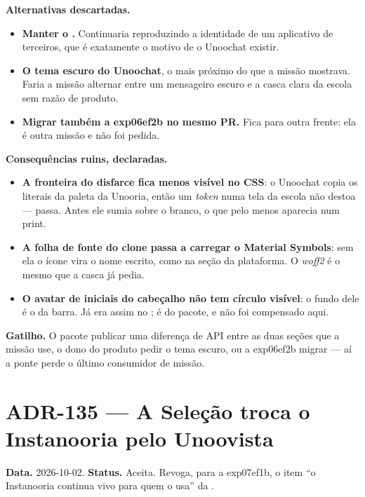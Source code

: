 \textbf{Alternativas descartadas.}

\begin{itemize}
  \item \textbf{Manter o .} Continuaria reproduzindo a
    identidade de um aplicativo de terceiros, que é exatamente o motivo de o
    Unoochat existir.
  \item \textbf{O tema escuro do Unoochat}, o mais próximo do que a missão
    mostrava. Faria a missão alternar entre um mensageiro escuro e a casca
    clara da escola sem razão de produto.
  \item \textbf{Migrar também a exp06ef2b no mesmo PR.} Fica para outra
    frente: ela é outra missão e não foi pedida.
\end{itemize}

\textbf{Consequências ruins, declaradas.}

\begin{itemize}
  \item \textbf{A fronteira do disfarce fica menos visível no CSS}: o
    Unoochat copia os literais da paleta da Unooria, então um \emph{token}
     numa tela da escola não destoa --- passa. Antes ele sumia
    sobre o branco, o que pelo menos aparecia num print.
  \item \textbf{A folha de fonte do clone passa a carregar o Material
    Symbols}: sem ela o ícone vira o nome escrito, como na seção da
    plataforma. O \emph{woff2} é o mesmo que a casca já pedia.
  \item \textbf{O avatar de iniciais do cabeçalho não tem círculo visível}:
    o fundo dele é o da barra. Já era assim no ; é do
    pacote, e não foi compensado aqui.
\end{itemize}

\textbf{Gatilho.} O pacote publicar uma diferença de API entre as duas seções
que a missão use, o dono do produto pedir o tema escuro, ou a exp06ef2b migrar
--- aí a ponte  perde o último consumidor de missão.

\section{ADR-135 --- A Seleção troca o Instanooria pelo Unoovista}
\label{adr:exp07ef1b-unoovista}

\textbf{Data.} 2026-10-02. \textbf{Status.} Aceita. Revoga, para a exp07ef1b,
o item \enquote{o Instanooria continua vivo para quem o usa} da
.

